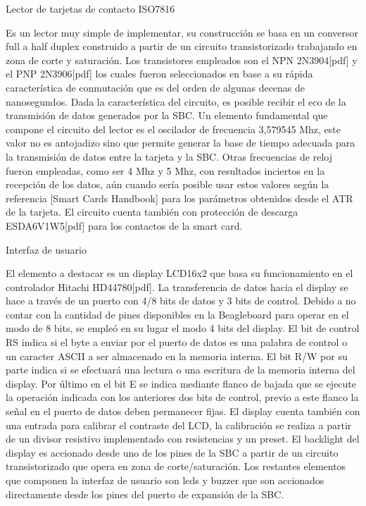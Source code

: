 \bigskip
\bigskip
\bigskip

Lector de tarjetas de contacto ISO7816

Es un lector muy simple de implementar, su construcción se basa en un conversor full a half duplex construido a partir de un circuito transistorizado trabajando en zona de corte y saturación. Los transistores empleados son el NPN 2N3904[pdf] y el PNP 2N3906[pdf] los cuales fueron seleccionados en base a su rápida característica de conmutación que es del orden de algunas decenas de nanosegundos. Dada la característica del circuito, es posible recibir el eco de la transmisión de datos generados por la SBC. 
Un elemento fundamental que compone el circuito del lector es el oscilador de frecuencia 3,579545 Mhz, este valor no es antojadizo sino que permite generar la base de tiempo adecuada para la transmisión de datos entre la tarjeta y la SBC. Otras frecuencias de reloj fueron empleadas, como ser 4 Mhz y 5 Mhz, con resultados inciertos en la recepción de los datos, aún cuando sería posible usar estos valores según la referencia [Smart Cards Handbook] para los parámetros obtenidos desde el ATR de la tarjeta. 
El circuito cuenta también con protección de descarga ESDA6V1W5[pdf] para los contactos de la smart card.


Interfaz de usuario

El elemento a destacar es un display LCD16x2 que basa su funcionamiento en el controlador Hitachi HD44780[pdf]. La transferencia de datos hacia el display se hace a través de un puerto con 4/8 bits de datos y 3 bits de control. Debido a no contar con la cantidad de pines disponibles en la Beagleboard para operar en el modo de 8 bits, se empleó en su lugar el modo 4 bits del display. El bit de control RS indica si el byte a enviar por el puerto de datos es una palabra de control o un caracter ASCII a ser almacenado en la memoria interna. El bit R/W por su parte indica si se efectuará una lectura o una escritura de la memoria interna del display. Por último en el bit E se indica mediante flanco de bajada que se ejecute la operación indicada con los anteriores dos bits de control, previo a este flanco la señal en el puerto de datos deben permanecer fijas.
El display cuenta también con una entrada para calibrar el contraste del LCD, la calibración se realiza a partir de un divisor resistivo implementado con resistencias y un preset.
El backlight del display es accionado desde uno de los pines de la SBC a partir de un circuito transistorizado que opera en zona de corte/saturación.
Los restantes elementos que componen la interfaz de usuario son leds y buzzer que son accionados directamente desde los pines del puerto de expansión de la SBC.

